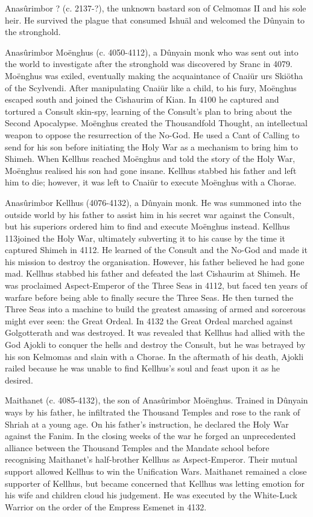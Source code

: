\documentclass[]{book}
\begin{document}
Anasûrimbor ? (c. 2137-?), the unknown bastard son of Celmomas II and his sole
heir. He survived the plague that consumed Ishuäl and welcomed the Dûnyain
to the stronghold.

Anasûrimbor Moënghus (c. 4050-4112), a Dûnyain monk who was sent out into the
world to investigate after the stronghold was discovered by Sranc in 4079.
Moënghus was exiled, eventually making the acquaintance of Cnaiür urs
Skiötha of the Scylvendi. After manipulating Cnaiür like a child, to his fury,
Moënghus escaped south and joined the Cishaurim of Kian. In 4100 he
captured and tortured a Consult skin-spy, learning of the Consult's plan to
bring about the Second Apocalypse. Moënghus created the Thousandfold
Thought, an intellectual weapon to oppose the resurrection of the No-God. He
used a Cant of Calling to send for his son before initiating the Holy War as a
mechanism to bring him to Shimeh. When Kellhus reached Moënghus and told
the story of the Holy War, Moënghus realised his son had gone insane. Kellhus
stabbed his father and left him to die; however, it was left to Cnaiür to execute
Moënghus with a Chorae.

Anasûrimbor Kellhus (4076-4132), a Dûnyain monk. He was summoned into the
outside world by his father to assist him in his secret war against the Consult,
but his superiors ordered him to find and execute Moënghus instead. Kellhus
113joined the Holy War, ultimately subverting it to his cause by the time it
captured Shimeh in 4112. He learned of the Consult and the No-God and
made it his mission to destroy the organisation. However, his father believed he
had gone mad. Kellhus stabbed his father and defeated the last Cishaurim at
Shimeh. He was proclaimed Aspect-Emperor of the Three Seas in 4112, but
faced ten years of warfare before being able to finally secure the Three Seas. He
then turned the Three Seas into a machine to build the greatest amassing of
armed and sorcerous might ever seen: the Great Ordeal. In 4132 the Great
Ordeal marched against Golgotterath and was destroyed. It was revealed that
Kellhus had allied with the God Ajokli to conquer the hells and destroy the
Consult, but he was betrayed by his son Kelmomas and slain with a Chorae. In
the aftermath of his death, Ajokli railed because he was unable to find Kellhus's
soul and feast upon it as he desired.

Maithanet (c. 4085-4132), the son of Anasûrimbor Moënghus. Trained in Dûnyain
ways by his father, he infiltrated the Thousand Temples and rose to the rank of
Shriah at a young age. On his father's instruction, he declared the Holy War
against the Fanim. In the closing weeks of the war he forged an unprecedented
alliance between the Thousand Temples and the Mandate school before
recognising Maithanet's half-brother Kellhus as Aspect-Emperor. Their mutual
support allowed Kellhus to win the Unification Wars. Maithanet remained a
close supporter of Kellhus, but became concerned that Kellhus was letting
emotion for his wife and children cloud his judgement. He was executed by the
White-Luck Warrior on the order of the Empress Esmenet in 4132.
\end{document}
